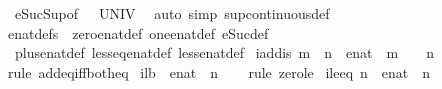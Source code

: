 \begin{isabellebody}
\ \ eSuc{\isacharunderscore}Sup{\isacharbrackleft}of\ {\isachardoublequoteopen}{\isacharunderscore}\ {\isacharbackquote}\ UNIV{\isachardoublequoteclose}{\isacharbrackright}\ \isamarkupfalse%
\ {\isacharparenleft}auto\ simp{\isacharcolon}\ sup{\isacharunderscore}continuous{\isacharunderscore}def{\isacharparenright}%
\endisatagproof
{\isafoldproof}%
%
\isadelimproof
%
\endisadelimproof
%
\isadelimdocument
%
\endisadelimdocument
%
\isatagdocument
%
\isamarkuptrue%
%
\endisatagdocument
{\isafolddocument}%
%
\isadelimdocument
%
\endisadelimdocument
{}\isamarkupfalse%
\ enat{\isacharunderscore}defs\ {\isacharequal}\ zero{\isacharunderscore}enat{\isacharunderscore}def\ one{\isacharunderscore}enat{\isacharunderscore}def\ eSuc{\isacharunderscore}def\isanewline
\ \ plus{\isacharunderscore}enat{\isacharunderscore}def\ less{\isacharunderscore}eq{\isacharunderscore}enat{\isacharunderscore}def\ less{\isacharunderscore}enat{\isacharunderscore}def\isanewline
\isanewline
{}\isamarkupfalse%
\ iadd{\isacharunderscore}is{\isacharunderscore}{}{\isacharcolon}\ {\isachardoublequoteopen}{\isacharparenleft}m\ {\isacharplus}\ n\ {\isacharequal}\ {\isacharparenleft}{}{\isacharcolon}{\isacharcolon}enat{\isacharparenright}{\isacharparenright}\ {\isacharequal}\ {\isacharparenleft}m\ {\isacharequal}\ {}\ {\isasymand}\ n\ {\isacharequal}\ {}{\isacharparenright}{\isachardoublequoteclose}\isanewline
%
\isadelimproof
\ \ %
\endisadelimproof
%
\isatagproof
{}\isamarkupfalse%
\ {\isacharparenleft}rule\ add{\isacharunderscore}eq{\isacharunderscore}{}{\isacharunderscore}iff{\isacharunderscore}both{\isacharunderscore}eq{\isacharunderscore}{}{\isacharparenright}%
\endisatagproof
{\isafoldproof}%
%
\isadelimproof
\isanewline
%
\endisadelimproof
\isanewline
{}\isamarkupfalse%
\ i{}{\isacharunderscore}lb\ {\isacharcolon}\ {\isachardoublequoteopen}{\isacharparenleft}{}{\isacharcolon}{\isacharcolon}enat{\isacharparenright}\ {\isasymle}\ n{\isachardoublequoteclose}\isanewline
%
\isadelimproof
\ \ %
\endisadelimproof
%
\isatagproof
{}\isamarkupfalse%
\ {\isacharparenleft}rule\ zero{\isacharunderscore}le{\isacharparenright}%
\endisatagproof
{\isafoldproof}%
%
\isadelimproof
\isanewline
%
\endisadelimproof
\isanewline
{}\isamarkupfalse%
\ ile{}{\isacharunderscore}eq{\isacharcolon}\ {\isachardoublequoteopen}n\ {\isasymle}\ {\isacharparenleft}{}{\isacharcolon}{\isacharcolon}enat{\isacharparenright}\ {\isasymlongleftrightarrow}\ n\ {\isacharequal}\ {}{\isachardoublequoteclose}\isanewline

\end{isabellebody}
